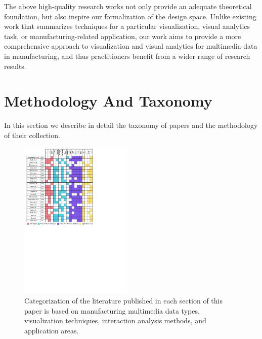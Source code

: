 \documentclass[a4paper,fleqn]{cas-dc}
\begin{document}
The above high-quality research works not only provide an adequate theoretical foundation, but also inspire our formalization of the design space. Unlike existing work that summarizes techniques for a particular visualization, visual analytics task, or manufacturing-related application, our work aims to provide a more comprehensive approach to visualization and visual analytics for multimedia data in manufacturing, and thus practitioners benefit from a wider range of research results.

\section{Methodology And Taxonomy}
In this section we describe in detail the taxonomy of papers and the methodology of their collection.  
 
\begin{figure}[pos=t]
	\centering
	\vspace{.5em}
	\includegraphics[width=0.48\textwidth]{Images/table.pdf}
	\caption{Categorization of the literature published in each section of this paper is based on manufacturing multimedia data types, visualization techniques, interaction analysis methods, and application areas.}
	\vspace{-1em}
	\label{fig:table}
\end{figure}
 
\end{document}
